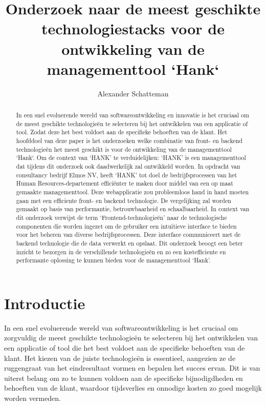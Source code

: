 \documentclass{hogent-article}
\title{Onderzoek naar de meest geschikte technologiestacks voor de ontwikkeling van de managementtool `Hank`}
\author{Alexander Schatteman}
\begin{document}
\begin{abstract}
    In een snel evoluerende wereld van softwareontwikkeling en innovatie is het cruciaal om de meest geschikte technologieën te selecteren bij het ontwikkelen van een applicatie of tool. Zodat deze het best voldoet aan de specifieke behoeften van de klant.
    \bigskip
    Het hoofddoel van deze paper is het onderzoeken welke combinatie van front- en backend technologieën het meest geschikt is voor de ontwikkeling van de managementtool `Hank`.
    \bigskip
    Om de context van `HANK' te verduidelijken: `HANK' is een managementtool dat tijdens dit onderzoek ook daadwerkelijk zal ontwikkeld worden. In opdracht van consultancy bedrijf Elmos NV, heeft `HANK' tot doel de bedrijfsprocessen van het Human Resources-departement efficiënter te maken door middel van een op maat gemaakte managementtool. Deze webapplicatie zou probleemloos hand in hand moeten gaan met een efficiente front- en backend technologie. 
    \bigskip
    De vergelijking zal worden gemaakt op basis van performantie, betrouwbaarheid en schaalbaarheid. In context van dit onderzoek verwijst de term `Frontend-technologieën' naar de technologische componenten die worden ingezet om de gebruiker een intuïtieve interface te bieden voor het beheren van diverse bedrijfsprocessen. Deze interface communiceert met de backend technologie die de data verwerkt en opslaat. 
    \bigskip
    Dit onderzoek beoogt een beter inzicht te bezorgen in de verschillende technologieën en zo een kostefficiente en performante oplossing te kunnen bieden voor de managementtool `Hank'.
\end{abstract}

\tableofcontents
\section{Introductie}%
\label{sec:introductie}
  In een snel evoluerende wereld van softwareontwikkeling is het cruciaal om zorgvuldig de meest geschikte technologieën te selecteren bij het ontwikkelen van een applicatie of tool die het best voldoet aan de specifieke behoeften van de klant.
  Het kiezen van de juiste technologieën is essentieel, aangezien ze de ruggengraat van het eindresultaat vormen en bepalen het succes ervan. Dit is van uiterst belang om zo te kunnen voldoen aan de specifieke bijnodigdheden en behoeften van de klant, waardoor tijdsverlies en onnodige kosten zo goed mogelijk worden vermeden. 
  
\end{document}
